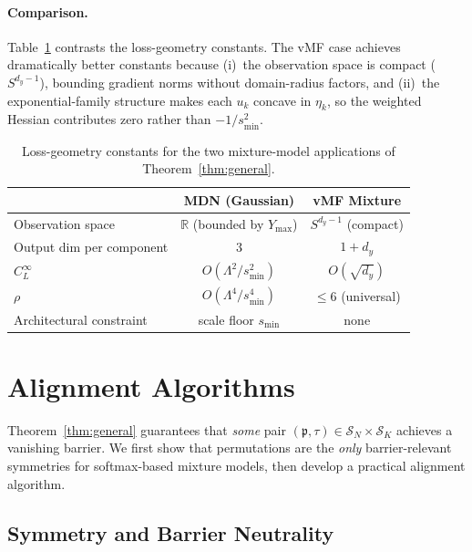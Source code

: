 \documentclass[11pt]{article}
\newcommand{\R}{\mathbb{R}}
\newcommand{\cS}{\mathcal{S}}
\newcommand{\nperm}{\mathfrak{p}}  %
\begin{document}
\paragraph{Comparison.}
Table~\ref{tab:loss_comparison} contrasts the loss-geometry
constants.
The vMF case achieves dramatically better constants because
(i)~the observation space is compact ($S^{d_y-1}$), bounding
gradient norms without domain-radius factors, and
(ii)~the exponential-family structure makes each $u_k$ concave
in $\eta_k$, so the weighted Hessian contributes zero rather than
$-1/s_{\min}^2$.

\begin{table}[t]
\centering\small
\caption{Loss-geometry constants for the two mixture-model
  applications of Theorem~\ref{thm:general}.}
\label{tab:loss_comparison}
\begin{tabular}{@{}lcc@{}}
\toprule
 & \textbf{MDN (Gaussian)} & \textbf{vMF Mixture} \\
\midrule
Observation space & $\R$ (bounded by $Y_{\max}$) & $S^{d_y-1}$ (compact) \\
Output dim per component & $3$ & $1+d_y$ \\
$C_L^\infty$ & $O(\Lambda^2/s_{\min}^2)$ & $O(\sqrt{d_y})$ \\
$\rho$ & $O(\Lambda^4/s_{\min}^4)$ & $\le 6$ (universal) \\
Architectural constraint & scale floor $s_{\min}$ & none \\
\bottomrule
\end{tabular}
\end{table}

\section{Alignment Algorithms}
\label{sec:algorithm}

Theorem~\ref{thm:general} guarantees that
\emph{some} pair $(\nperm, \tau) \in \cS_N \times \cS_K$ achieves a
vanishing barrier.
We first show that permutations are the \emph{only} barrier-relevant
symmetries for softmax-based mixture models, then develop a practical
alignment algorithm.

\subsection{Symmetry and Barrier Neutrality}\label{sec:symmetry}
\end{document}
